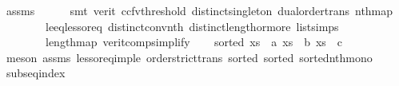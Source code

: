 \begin{isabellebody}
\ assms{\isacharparenleft}{\kern0pt}{}{\isacharcomma}{\kern0pt}{}{\isacharcomma}{\kern0pt}{}{\isacharcomma}{\kern0pt}{}{\isacharparenright}{\kern0pt}\isanewline
\ \ \ \ \isamarkupfalse%
\ {\isacharparenleft}{\kern0pt}smt\ {\isacharparenleft}{\kern0pt}verit{\isacharcomma}{\kern0pt}\ ccfv{\isacharunderscore}{\kern0pt}threshold{\isacharparenright}{\kern0pt}\ distinct{\isacharunderscore}{\kern0pt}singleton\ dual{\isacharunderscore}{\kern0pt}order{\isachardot}{\kern0pt}trans\ nth{\isacharunderscore}{\kern0pt}map\isanewline
\ \ \ \ \ \ \ \ le{\isacharunderscore}{\kern0pt}eq{\isacharunderscore}{\kern0pt}less{\isacharunderscore}{\kern0pt}or{\isacharunderscore}{\kern0pt}eq\ distinct{\isacharunderscore}{\kern0pt}conv{\isacharunderscore}{\kern0pt}nth\ distinct{\isacharunderscore}{\kern0pt}length{\isacharunderscore}{\kern0pt}{}{\isacharunderscore}{\kern0pt}or{\isacharunderscore}{\kern0pt}more\ list{\isachardot}{\kern0pt}simps{\isacharparenleft}{\kern0pt}{}{\isacharcomma}{\kern0pt}{}{\isacharparenright}{\kern0pt}\isanewline
\ \ \ \ \ \ \ \ length{\isacharunderscore}{\kern0pt}map\ verit{\isacharunderscore}{\kern0pt}comp{\isacharunderscore}{\kern0pt}simplify{}{\isacharparenleft}{\kern0pt}{}{\isacharparenright}{\kern0pt}{\isacharparenright}{\kern0pt}\isanewline
{}\isamarkupfalse%
\isanewline
\ \ \isamarkupfalse%
\ {\isachardoublequoteopen}sorted\ {\isacharbrackleft}{\kern0pt}xs\ {\isacharbang}{\kern0pt}\ a{\isacharcomma}{\kern0pt}\ xs\ {\isacharbang}{\kern0pt}\ b{\isacharcomma}{\kern0pt}\ xs\ {\isacharbang}{\kern0pt}\ c{\isacharbrackright}{\kern0pt}{\isachardoublequoteclose}\isanewline
\ \ \ \ \isamarkupfalse%
\ {\isacharparenleft}{\kern0pt}meson\ assms{\isacharparenleft}{\kern0pt}{}{\isacharcomma}{\kern0pt}{}{\isacharcomma}{\kern0pt}{}{\isacharcomma}{\kern0pt}{}{\isacharparenright}{\kern0pt}\ less{\isacharunderscore}{\kern0pt}or{\isacharunderscore}{\kern0pt}eq{\isacharunderscore}{\kern0pt}imp{\isacharunderscore}{\kern0pt}le\ order{\isachardot}{\kern0pt}strict{\isacharunderscore}{\kern0pt}trans{}\ sorted{}\ sorted{}\ sorted{\isacharunderscore}{\kern0pt}nth{\isacharunderscore}{\kern0pt}mono{\isacharparenright}{\kern0pt}\isanewline
{}\isamarkupfalse%
%
\endisatagproof
{\isafoldproof}%
%
\isadelimproof
\isanewline
%
\endisadelimproof
\isanewline
{}\isamarkupfalse%
\ subseq{\isacharunderscore}{\kern0pt}index{\isacharcolon}{\kern0pt}\isanewline

\end{isabellebody}
